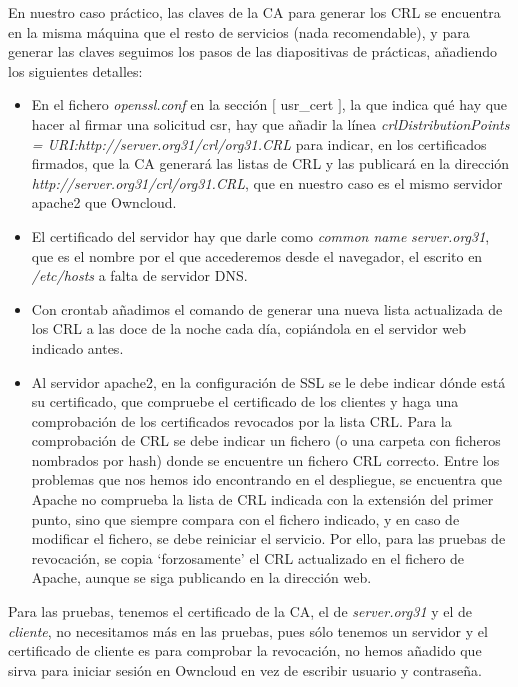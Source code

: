 \documentclass[]{article}
\begin{document}
En nuestro caso práctico, las claves de la CA para generar los CRL se encuentra en la misma máquina que el resto de servicios (nada recomendable), y para generar las claves seguimos los pasos de las diapositivas de prácticas, añadiendo los siguientes detalles:

\begin{itemize}
	\item En el fichero \textit{openssl.conf} en la sección $[$ usr\_cert $]$, la que indica qué hay que hacer al firmar una solicitud csr, hay que añadir la línea \textit{crlDistributionPoints = URI:http://server.org31/crl/org31.CRL} para indicar, en los certificados firmados, que la CA generará las listas de CRL y las publicará en la dirección \textit{http://server.org31/crl/org31.CRL}, que en nuestro caso es el mismo servidor apache2 que Owncloud.
	\item El certificado del servidor hay que darle como \textit{common name} \textit{server.org31}, que es el nombre por el que accederemos desde el navegador, el escrito en \textit{/etc/hosts} a falta de servidor DNS.
	\item Con crontab añadimos el comando de generar una nueva lista actualizada de los CRL a las doce de la noche cada día, copiándola en el servidor web indicado antes.
	\item Al servidor apache2, en la configuración de SSL se le debe indicar dónde está su certificado, que compruebe el certificado de los clientes y haga una comprobación de los certificados revocados por la lista CRL.
	\subitem Para la comprobación de CRL se debe indicar un fichero (o una carpeta con ficheros nombrados por hash) donde se encuentre un fichero CRL correcto.
	\subitem Entre los problemas que nos hemos ido encontrando en el despliegue, se encuentra que Apache no comprueba la lista de CRL indicada con la extensión del primer punto, sino que siempre compara con el fichero indicado, y en caso de modificar el fichero, se debe reiniciar el servicio. Por ello, para las pruebas de revocación, se copia `forzosamente' el CRL actualizado en el fichero de Apache, aunque se siga publicando en la dirección web.
\end{itemize}

\hfill

Para las pruebas, tenemos el certificado de la CA, el de \textit{server.org31} y el de \textit{cliente}, no necesitamos más en las pruebas, pues sólo tenemos un servidor y el certificado de cliente es para comprobar la revocación, no hemos añadido que sirva para iniciar sesión en Owncloud en vez de escribir usuario y contraseña.
\end{document}
